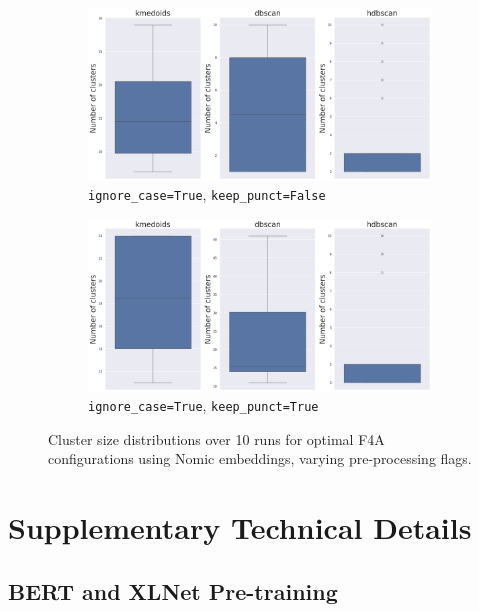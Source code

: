\documentclass[10pt,oneside]{report}
\begin{document}
\begin{figure}[H]
    \ContinuedFloat
    \centering
    \begin{subfigure}[b]{\textwidth}
        \centering
        \includegraphics[width=\textwidth]{./images/nomic_false-true_whisker.png}
        \caption{\texttt{ignore\_case=True}, \texttt{keep\_punct=False}} \label{fig:nomic_tf_f4a_whisker}
    \end{subfigure}
    \hfill
    \begin{subfigure}[b]{\textwidth}
        \centering
        \includegraphics[width=\textwidth]{./images/nomic_true-true_whisker.png}
        \caption{\texttt{ignore\_case=True}, \texttt{keep\_punct=True}} \label{fig:nomic_tt_f4a_whisker}
    \end{subfigure}
    \caption{Cluster size distributions over 10 runs for optimal F4A configurations using Nomic embeddings, varying pre-processing flags.}
    \label{fig:nomic_f4a_whisker_appendix}
\end{figure}


\pagebreak
\chapter{Supplementary Technical Details}
\section{BERT and XLNet Pre-training}\label{app:bert_xlnet_details}
\end{document}
